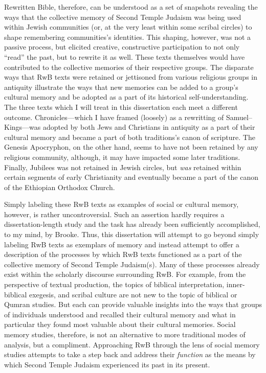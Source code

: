 Rewritten Bible, therefore, can be understood as a set of snapshots
revealing the ways that the collective memory of Second Temple Judaism
was being used within Jewish communities (or, at the very least within
some scribal circles) to shape remembering communities's identities.
This shaping, however, was not a passive process, but elicited creative,
constructive participation to not only ``read'' the past, but to rewrite
it as well. These texts themselves would have contributed to the
collective memories of their respective groups. The disparate ways that
RwB texts were retained or jettisoned from various religious groups in
antiquity illustrate the ways that new memories can be added to a
group's cultural memory and be adopted as a part of its historical
self-understanding. The three texts which I will treat in this
dissertation each meet a different outcome. Chronicles---which I have
framed (loosely) as a rewritting of Samuel--Kings---was adopted by both
Jews and Christians in antiquity as a part of their cultural memory and
became a part of both traditions's canon of scripture. The
Genesis Apocryphon, on the other hand, seems to have not been retained
by any religious community, although, it may have impacted some later
traditions. Finally, Jubilees was not retained in Jewish circles, but
\emph{was} retained within certain segments of early Christianity and
eventually became a part of the canon of the Ethiopian Orthodox Church.

Simply labeling these RwB texts as examples of social or cultural
memory, however, is rather uncontroversial. Such an assertion hardly
requires a dissertation-length study and the task has already been
sufficiently accomplished, to my mind, by
Brooke.\autocite{brooke_zsengeller2014} Thus, this dissertation will
attempt to go beyond simply labeling RwB texts as exemplars of memory
and instead attempt to offer a description of the processes by which RwB
texts functioned as a part of the collective memory of Second Temple
Judaism(s). Many of these processes already exist within the scholarly
discourse surrounding RwB. For example, from the perspective of textual
production, the topics of biblical interpretation, inner-biblical
exegesis, and scribal culture are not new to the topic of biblical or
Qumran studies. But each can provide valuable insights into the ways
that groups of individuals understood and recalled their cultural memory
and what in particular they found most valuable about their cultural
memories. Social memory studies, therefore, is not an alternative to
more traditional modes of analysis, but a compliment. Approaching RwB
through the lens of social memory studies attempts to take a step back
and address their \emph{function} as the means by which Second Temple
Judaism experienced its past in its present.
